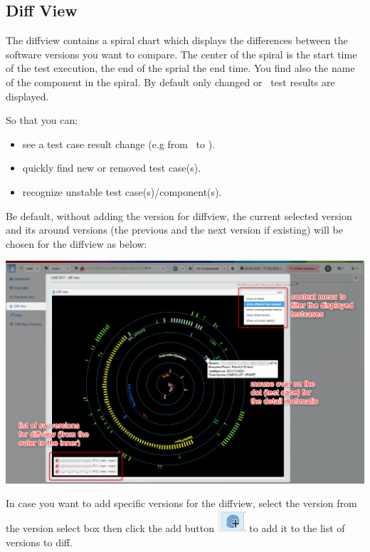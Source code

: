 \hypertarget{diff-view}{%
\subsection{Diff View}\label{diff-view}}
The diffview contains a spiral chart which displays the differences
between the software versions you want to compare.
The center of the spiral is the start time of the test execution,
the end of the sprial the end time. You find also the name of the
component in the spiral.
By default only changed or \failed\ test results are displayed.

So that you can:
\begin{itemize}
   \item see a test case result change (e.g from \passed\ to \failed).
   \item quickly find new or removed test case(s).
   \item recognize unstable test case(s)/component(s).
\end{itemize}

Be default, without adding the version for diffview, the current selected
version and its around versions (the previous and the next version if existing)
will be chosen for the diffview as below:

\includegraphics[width=1\linewidth]{./pictures/diffview/default_detail.png}

In case you want to add specific versions for the diffview, select the version
from the version select box then click the add button
\includegraphics[width=0.04\linewidth]{./pictures/diffview/add_button.png}
to add it to the list of versions to diff.

